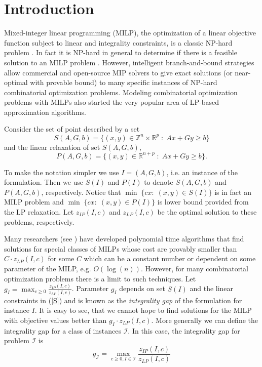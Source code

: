 
\section{Introduction}
Mixed-integer linear programming (MILP), the optimization of a linear objective function subject to linear and integrality constraints, is a classic NP-hard problem \cite{GJ79}. In fact it is NP-hard in general to determine if there is a feasible solution to an MILP problem \cite{GJ79}. However, intelligent branch-and-bound strategies allow commercial and open-source MIP solvers to give exact solutions (or near-optimal with provable bound) to many specific instances of NP-hard combinatorial optimization problems. Modeling combinatorial optimization problems with MILPs also started the very popular area of LP-based approximation algorithms. 

Consider the set of point described by a set 
\begin{equation}
S(A,G,b)= \{(x,y)\in \mathbb{Z}^{n}\times \mathbb{R}^p\;:\; Ax+Gy\geq b\}  \label{S}
\end{equation}
and the  linear relaxation of set $S(A,G,b)$,
\begin{equation}
P(A,G,b) = \{(x,y)\in \mathbb{R}^{n+ p}\;:\; Ax+Gy\geq b\}. \label{P}
\end{equation}

To make the notation simpler we use $I=(A,G,b)$, i.e. an instance of the formulation. Then we use $S(I)$ and $P(I)$ to denote $S(A,G,b)$ and $P(A,G,b)$, respectively. Notice that $\min \;\{cx:\; (x,y) \in S(I)\}$ is in fact an MILP problem and $\min \;\{cx:\;(x,y)\in P(I) \}$ is lower bound provided from the LP relaxation. Let $z_{IP}(I,c)$ and $z_{LP}(I,c)$ be the optimal solution to these problems, respectively.


Many researchers (see \cite{sw, vazirani}) have developed polynomial time algorithms that find solutions for special classes of MILPs whose cost are provably smaller than $C\cdot z_{LP}(I,c)$ for some $C$ which can be a constant number or dependent on some parameter of the MILP, e.g. $O(\log(n))$. However, for many combinatorial optimization problems there is a limit to such techniques. Let $g_I= \max_{c\geq 0}\frac{z_{IP}(I,c)}{z_{LP}(I,c)}$. Parameter $g_I$ depends on set $S(I)$ and the linear constraints in (\ref{S}) and is known as the \textit{integrality gap} of the formulation for instance $I$. It is easy to see, that we cannot hope to find solutions for the MILP with objective values better than $g_I\cdot z_{LP}(I,c)$. More generally we can define the integrality gap for a class of instances $\mathcal{I}$. In this case, the integrality gap for problem $\mathcal{I}$ is
\begin{equation}
g_\mathcal{I} = \max_{c\geq 0 , I\in\mathcal{I}}\frac{z_{IP}(I,c)}{z_{LP}(I,c)}
\end{equation}


